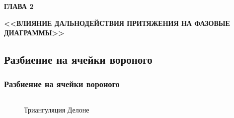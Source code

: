 \documentclass[pdf,hyperref={unicode}]{beamer}
\begin{document}
\begin{frame}
\begin{center}
\begin{LARGE}
\textbf{ГЛАВА 2} \\
\end{LARGE}
\vspace{5mm}
\textbf{<<ВЛИЯНИЕ ДАЛЬНОДЕЙСТВИЯ ПРИТЯЖЕНИЯ НА ФАЗОВЫЕ ДИАГРАММЫ>>}
\end{center}
\end{frame}


\subsection{Разбиение на ячейки вороного}


\begin{frame}%
\transdissolve[duration=0.2]
\frametitle{Разбиение на ячейки вороного}

\begin{columns}

{
\begin{column}{0.3\linewidth}
\begin{figure}[h]
\caption{Триангуляция Делоне}
\end{figure}
\end{column}
}


\end{columns}
\end{frame}
\end{document}
